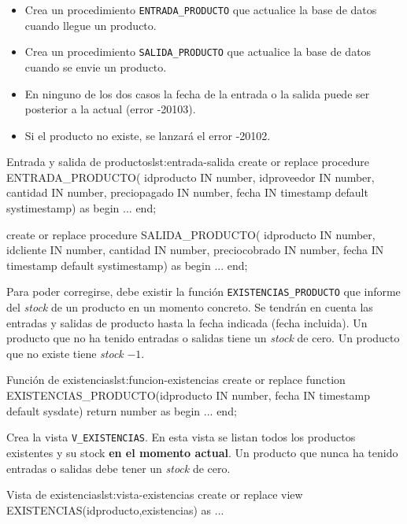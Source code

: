 \begin{homeworkProblem}

  \begin{itemize}
  \item Crea un procedimiento \texttt{ENTRADA\_PRODUCTO} que actualice la base de datos cuando llegue un producto.
  \item Crea un procedimiento \texttt{SALIDA\_PRODUCTO} que actualice la base de datos cuando se envie un producto.
  \item En ninguno de los dos casos la fecha de la entrada o la salida puede ser posterior a la actual (error -20103).
  \item Si el producto no existe, se lanzará el error -20102.
  \end{itemize}
  
  \begin{listadosql}{Entrada y salida de productos}{lst:entrada-salida}
create or replace procedure ENTRADA_PRODUCTO(
  idproducto IN number,
  idproveedor IN number,
  cantidad IN number,
  preciopagado IN number,
  fecha IN timestamp default systimestamp)
as
begin
  ...
end; 

create or replace procedure SALIDA_PRODUCTO(
  idproducto IN number,
  idcliente IN number,
  cantidad IN number,
  preciocobrado IN number,
  fecha IN timestamp default systimestamp)
as
begin
  ...
end; 
  \end{listadosql}

  Para poder corregirse, debe existir la función \texttt{EXISTENCIAS\_PRODUCTO} que informe del \textit{stock} de un producto en un momento concreto. Se tendrán en cuenta las entradas y salidas de producto hasta la fecha indicada (fecha incluida). Un producto que no ha tenido entradas o salidas tiene un \textit{stock} de cero. Un producto que no existe tiene \textit{stock} $-1$.

  \begin{listadosql}{Función de existencias}{lst:funcion-existencias}
create or replace function EXISTENCIAS_PRODUCTO(idproducto IN number, fecha IN timestamp default sysdate) return number
as
begin
  ...
end; 
  \end{listadosql}  
  


\end{homeworkProblem}

\begin{homeworkProblem}

  Crea la vista \texttt{V\_EXISTENCIAS}. En esta vista se listan todos los productos existentes y su stock \textbf{en el momento actual}. Un producto que nunca ha tenido entradas o salidas debe tener un \textit{stock} de cero.

  \begin{listadosql}{Vista de existencias}{lst:vista-existencias}
create or replace view EXISTENCIAS(idproducto,existencias) as
...
  \end{listadosql}  
  
\end{homeworkProblem}



